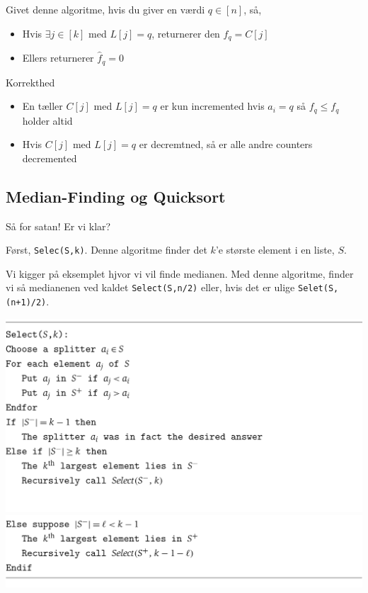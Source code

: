 \documentclass[11pt]{article}
\theoremstyle{definition}
\theoremstyle{remark}
\begin{document}
Givet denne algoritme, hvis du giver en værdi $q \in [n]$, så,
\begin{itemize}
\item Hvis $\exists j \in [k]$ med $L[j]=q$, returnerer den $\hat{f}_q = C[j]$
\item Ellers returnerer $\hat{f}_{q} = 0$
\end{itemize}

\noindent
\large Korrekthed\\
\noindent
\begin{itemize}
\item En tæller $C[j]$ med $L[j] = q$ er kun incremented hvis $a_{i} = q$ så $f_{q} \leq f_{q}$ holder altid
\item Hvis $C[j]$ med $L[j] = q$ er decremtned, så er alle andre counters decremented
\end{itemize}


\subsection{Median-Finding og Quicksort}
\label{subsec:label}

Så for satan! Er vi klar?

Først, \texttt{Selec(S,k)}. Denne algoritme finder det $k$'e største element i en liste, $S$. 

Vi kigger på eksemplet hjvor vi vil finde medianen. Med denne algoritme, finder vi så medianenen ved kaldet \texttt{Select(S,n/2)} eller, hvis det er ulige \texttt{Selet(S,(n+1)/2)}.

\noindent
\includegraphics[width=400pt]{main--randomized-algorithms--median-finding-og-quicksort-ead8.png}
\vspace{0cm}
\noindent
\includegraphics[width=400pt]{main--randomized-algorithms--median-finding-og-quicksort-4a2e.png}
\end{document}
